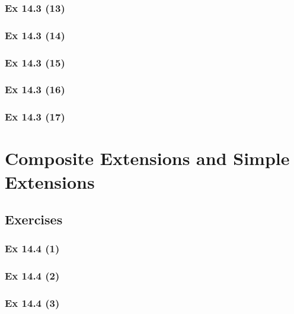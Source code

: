 \subsubsection{Ex 14.3 (13)}\label{sec:Ex_14.3.13}

\subsubsection{Ex 14.3 (14)}\label{sec:Ex_14.3.14}

\subsubsection{Ex 14.3 (15)}\label{sec:Ex_14.3.15}

\subsubsection{Ex 14.3 (16)}\label{sec:Ex_14.3.16}

\subsubsection{Ex 14.3 (17)}\label{sec:Ex_14.3.17}

\newpage		%

\section{Composite Extensions and Simple Extensions}\label{sec:14.4}	
\subsection*{Exercises}\label{sec:14.4_Exercises}

\subsubsection{Ex 14.4 (1)}\label{sec:Ex_14.4.1}

\subsubsection{Ex 14.4 (2)}\label{sec:Ex_14.4.2}

\subsubsection{Ex 14.4 (3)}\label{sec:Ex_14.4.3}

